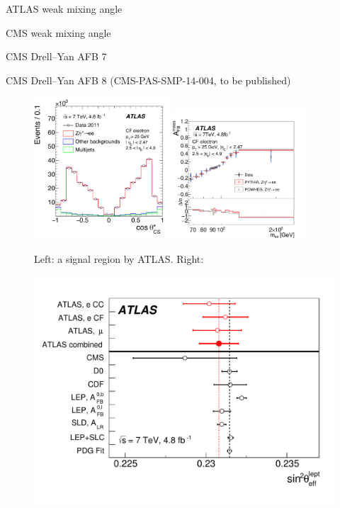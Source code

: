 ATLAS weak mixing angle~\cite{Aad:2015uau}

CMS weak mixing angle~\cite{Chatrchyan:2011ya}

CMS Drell--Yan AFB 7 \TeV~\cite{Chatrchyan:2012dc}

CMS Drell--Yan AFB 8 \TeV (CMS-PAS-SMP-14-004, to be published)
\begin{figure}[p]
    \centering
    \includegraphics[width=0.45\textwidth]{figures/ss-precision-afb-atlas-cf-ct.pdf}
    \includegraphics[width=0.45\textwidth]{figures/ss-precision-afb-atlas-cf-afb.pdf}
    \caption{
    Left:  a signal region by ATLAS.
    Right:  }
    \label{fig:ss-precision-afb-atlas-cf}
\end{figure}
\begin{figure}[p]
    \centering
    \includegraphics[height=0.3\textheight]{figures/ss-precision-afb-atlas-sin2thetaw.pdf}
    \caption{}
    \label{fig:ss-precision-afb-atlas-sin2thetaw}
\end{figure}
